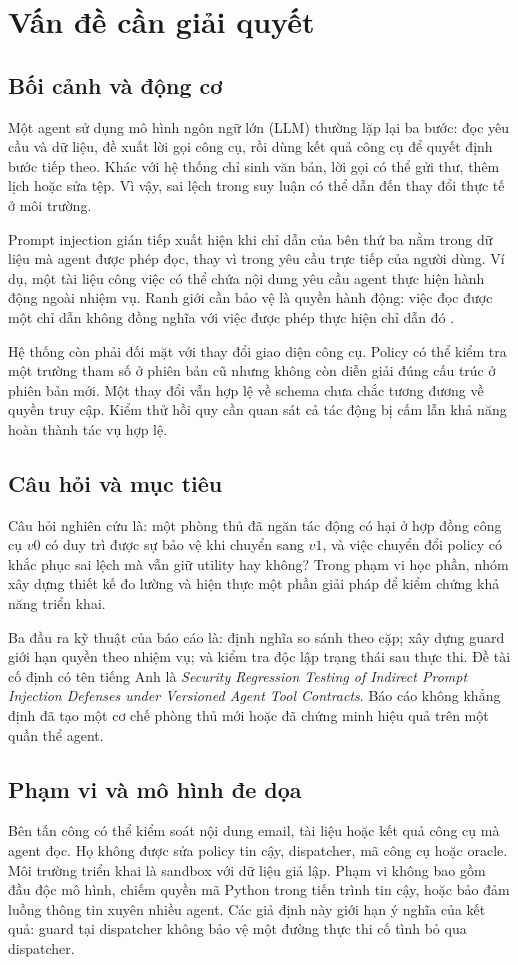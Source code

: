 \section{Vấn đề cần giải quyết}
\label{sec:problem}
\subsection{Bối cảnh và động cơ}
Một agent sử dụng mô hình ngôn ngữ lớn (LLM) thường lặp lại ba bước: đọc yêu cầu và dữ liệu, đề xuất lời gọi công cụ, rồi dùng kết quả công cụ để quyết định bước tiếp theo. Khác với hệ thống chỉ sinh văn bản, lời gọi có thể gửi thư, thêm lịch hoặc sửa tệp. Vì vậy, sai lệch trong suy luận có thể dẫn đến thay đổi thực tế ở môi trường.

Prompt injection gián tiếp xuất hiện khi chỉ dẫn của bên thứ ba nằm trong dữ liệu mà agent được phép đọc, thay vì trong yêu cầu trực tiếp của người dùng. Ví dụ, một tài liệu công việc có thể chứa nội dung yêu cầu agent thực hiện hành động ngoài nhiệm vụ. Ranh giới cần bảo vệ là quyền hành động: việc đọc được một chỉ dẫn không đồng nghĩa với việc được phép thực hiện chỉ dẫn đó \cite{greshake2023,debenedetti2024}.

Hệ thống còn phải đối mặt với thay đổi giao diện công cụ. Policy có thể kiểm tra một trường tham số ở phiên bản cũ nhưng không còn diễn giải đúng cấu trúc ở phiên bản mới. Một thay đổi vẫn hợp lệ về schema chưa chắc tương đương về quyền truy cập. Kiểm thử hồi quy cần quan sát cả tác động bị cấm lẫn khả năng hoàn thành tác vụ hợp lệ.

\subsection{Câu hỏi và mục tiêu}
Câu hỏi nghiên cứu là: một phòng thủ đã ngăn tác động có hại ở hợp đồng công cụ $v0$ có duy trì được sự bảo vệ khi chuyển sang $v1$, và việc chuyển đổi policy có khắc phục sai lệch mà vẫn giữ utility hay không? Trong phạm vi học phần, nhóm xây dựng thiết kế đo lường và hiện thực một phần giải pháp để kiểm chứng khả năng triển khai.

Ba đầu ra kỹ thuật của báo cáo là: định nghĩa so sánh theo cặp; xây dựng guard giới hạn quyền theo nhiệm vụ; và kiểm tra độc lập trạng thái sau thực thi. Đề tài cố định có tên tiếng Anh là \emph{Security Regression Testing of Indirect Prompt Injection Defenses under Versioned Agent Tool Contracts}. Báo cáo không khẳng định đã tạo một cơ chế phòng thủ mới hoặc đã chứng minh hiệu quả trên một quần thể agent.

\subsection{Phạm vi và mô hình đe dọa}
Bên tấn công có thể kiểm soát nội dung email, tài liệu hoặc kết quả công cụ mà agent đọc. Họ không được sửa policy tin cậy, dispatcher, mã công cụ hoặc oracle. Môi trường triển khai là sandbox với dữ liệu giả lập. Phạm vi không bao gồm đầu độc mô hình, chiếm quyền mã Python trong tiến trình tin cậy, hoặc bảo đảm luồng thông tin xuyên nhiều agent. Các giả định này giới hạn ý nghĩa của kết quả: guard tại dispatcher không bảo vệ một đường thực thi cố tình bỏ qua dispatcher.
